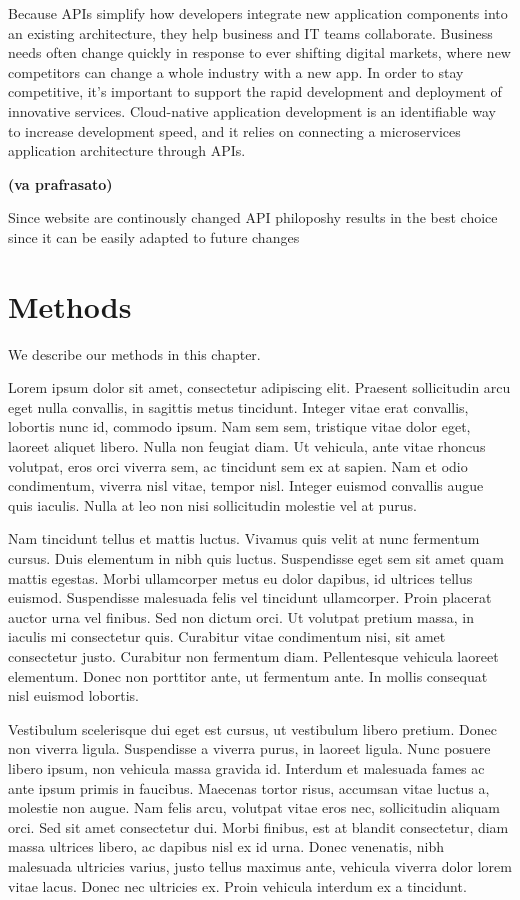 \documentclass[
  12pt,
  a4paper,
  oneside]{book}
\begin{document}
Because APIs simplify how developers integrate new application components into an existing architecture, they help business and IT teams collaborate. Business needs often change quickly in response to ever shifting digital markets, where new competitors can change a whole industry with a new app. In order to stay competitive, it's important to support the rapid development and deployment of innovative services. Cloud-native application development is an identifiable way to increase development speed, and it relies on connecting a microservices application architecture through APIs.

\textbf{(va prafrasato)}

Since website are continously changed API philoposhy results in the best choice since it can be easily adapted to future changes

\hypertarget{methods}{%
\chapter{Methods}\label{methods}}

We describe our methods in this chapter.

Lorem ipsum dolor sit amet, consectetur adipiscing elit. Praesent sollicitudin arcu eget nulla convallis, in sagittis metus tincidunt. Integer vitae erat convallis, lobortis nunc id, commodo ipsum. Nam sem sem, tristique vitae dolor eget, laoreet aliquet libero. Nulla non feugiat diam. Ut vehicula, ante vitae rhoncus volutpat, eros orci viverra sem, ac tincidunt sem ex at sapien. Nam et odio condimentum, viverra nisl vitae, tempor nisl. Integer euismod convallis augue quis iaculis. Nulla at leo non nisi sollicitudin molestie vel at purus.

Nam tincidunt tellus et mattis luctus. Vivamus quis velit at nunc fermentum cursus. Duis elementum in nibh quis luctus. Suspendisse eget sem sit amet quam mattis egestas. Morbi ullamcorper metus eu dolor dapibus, id ultrices tellus euismod. Suspendisse malesuada felis vel tincidunt ullamcorper. Proin placerat auctor urna vel finibus. Sed non dictum orci. Ut volutpat pretium massa, in iaculis mi consectetur quis. Curabitur vitae condimentum nisi, sit amet consectetur justo. Curabitur non fermentum diam. Pellentesque vehicula laoreet elementum. Donec non porttitor ante, ut fermentum ante. In mollis consequat nisl euismod lobortis.

Vestibulum scelerisque dui eget est cursus, ut vestibulum libero pretium. Donec non viverra ligula. Suspendisse a viverra purus, in laoreet ligula. Nunc posuere libero ipsum, non vehicula massa gravida id. Interdum et malesuada fames ac ante ipsum primis in faucibus. Maecenas tortor risus, accumsan vitae luctus a, molestie non augue. Nam felis arcu, volutpat vitae eros nec, sollicitudin aliquam orci. Sed sit amet consectetur dui. Morbi finibus, est at blandit consectetur, diam massa ultrices libero, ac dapibus nisl ex id urna. Donec venenatis, nibh malesuada ultricies varius, justo tellus maximus ante, vehicula viverra dolor lorem vitae lacus. Donec nec ultricies ex. Proin vehicula interdum ex a tincidunt.
\end{document}

